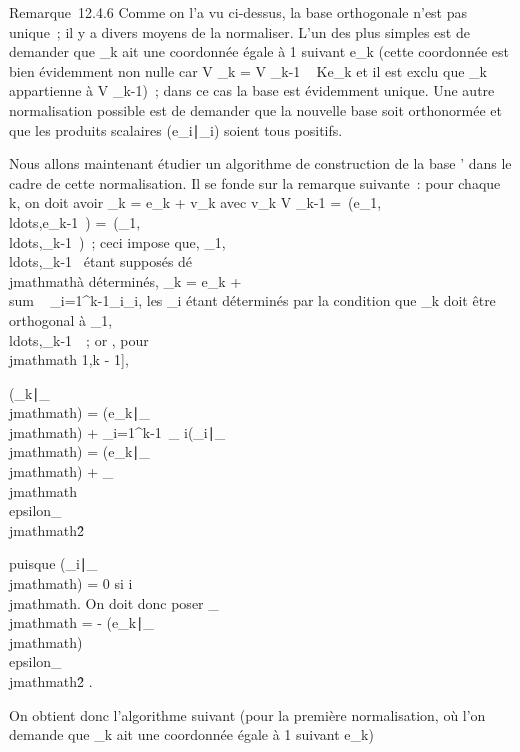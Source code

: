 \documentclass[]{article}
\begin{document}
Remarque~12.4.6 Comme on l'a vu ci-dessus, la base orthogonale n'est pas
unique~; il y a divers moyens de la normaliser. L'un des plus simples
est de demander que \epsilon_k ait une coordonnée égale à 1 suivant
e_k (cette coordonnée est bien évidemment non nulle car V
_k = V _k-1 \oplus~ Ke_k et il est exclu que
\epsilon_k appartienne à V _k-1)~; dans ce cas la base est
évidemment unique. Une autre normalisation possible est de demander que
la nouvelle base soit orthonormée et que les produits scalaires
(e_i∣\epsilon_i) soient tous
positifs.

Nous allons maintenant étudier un algorithme de construction de la base
' dans le cadre de cette normalisation. Il se fonde sur la remarque
suivante~: pour chaque k, on doit avoir \epsilon_k = e_k +
v_k avec v_k \in V _k-1
=\
\mathrmVect(e_1,\\ldots,e_k-1~)
=\
\mathrmVect(\epsilon_1,\\ldots,\epsilon_k-1~)~;
ceci impose que,
\epsilon_1,\\ldots,\epsilon_k-1~
étant supposés dé\\jmathmathà déterminés, \epsilon_k = e_k
+ \\sum ~
_i=1^k-1\alpha_i\epsilon_i, les \alpha_i étant
déterminés par la condition que \epsilon_k doit être orthogonal à
\epsilon_1,\\ldots,\epsilon_k-1~~;
or , pour \\jmathmath \in {[}1,k - 1{]},

(\epsilon_k∣\epsilon_\\jmathmath) =
(e_k∣\epsilon_\\jmathmath) +
\sum _i=1^k-1\alpha~_
i(\epsilon_i∣\epsilon_\\jmathmath) =
(e_k∣\epsilon_\\jmathmath) +
\alpha_\\jmathmath\\epsilon_\\jmathmath\^2

puisque (\epsilon_i∣\epsilon_\\jmathmath) = 0 si
i\neq~\\jmathmath. On doit donc poser \alpha_\\jmathmath = -
(e_k∣\epsilon_\\jmathmath)
\over
\\epsilon_\\jmathmath\^2
.

On obtient donc l'algorithme suivant (pour la première normalisation, où
l'on demande que \epsilon_k ait une coordonnée égale à 1 suivant
e_k)
\end{document}
